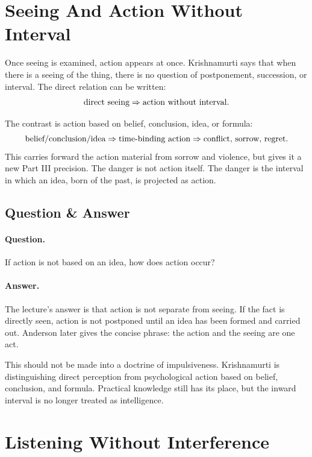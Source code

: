 \documentclass[11pt,oneside]{book}
\begin{document}
\section{Seeing And Action Without Interval}

Once seeing is examined, action appears at once. Krishnamurti says that when there is a seeing of the thing, there is no question of postponement, succession, or interval. The direct relation can be written:
\begin{equation}
\hbox{direct seeing}
\Rightarrow
\hbox{action without interval}.
\end{equation}

The contrast is action based on belief, conclusion, idea, or formula:
\begin{equation}
\hbox{belief/conclusion/idea}
\Rightarrow
\hbox{time-binding action}
\Rightarrow
\hbox{conflict, sorrow, regret}.
\end{equation}
This carries forward the action material from sorrow and violence, but gives it a new Part III precision. The danger is not action itself. The danger is the interval in which an idea, born of the past, is projected as action.

\subsection{Question \& Answer}

\paragraph{Question.}
If action is not based on an idea, how does action occur?

\paragraph{Answer.}
The lecture's answer is that action is not separate from seeing. If the fact is directly seen, action is not postponed until an idea has been formed and carried out. Anderson later gives the concise phrase: the action and the seeing are one act.

This should not be made into a doctrine of impulsiveness. Krishnamurti is distinguishing direct perception from psychological action based on belief, conclusion, and formula. Practical knowledge still has its place, but the inward interval is no longer treated as intelligence.

\section{Listening Without Interference}
\end{document}
